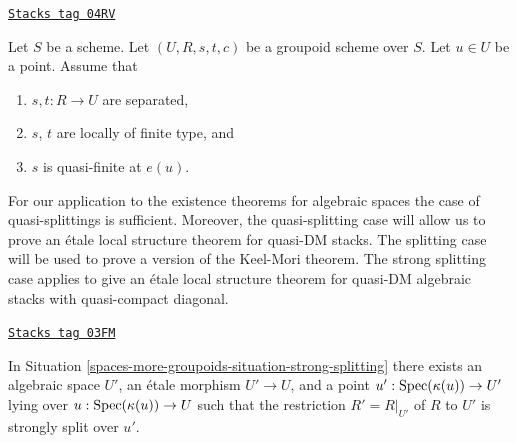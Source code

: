 \begin{definition}

\label{spaces-more-groupoids-situation-quasi-splitting}
\href{https://stacks.math.columbia.edu/tag/04RV}{\texttt{Stacks tag 04RV}}

Let $S$ be a scheme.
Let $(U, R, s, t, c)$ be a groupoid scheme over $S$.
Let $u \in U$ be a point. Assume that
\begin{enumerate}
\item $s, t : R \to U$ are separated,
\item $s$, $t$ are locally of finite type, and
\item $s$ is quasi-finite at $e(u)$.
\end{enumerate}
\end{definition}

For our application to the existence theorems for algebraic spaces
the case of quasi-splittings is sufficient. Moreover, the quasi-splitting
case will allow us to prove an \'etale local structure theorem for
quasi-DM stacks. The splitting case will be used to prove a version
of the Keel-Mori theorem. The strong splitting case applies to give
an \'etale local structure theorem for quasi-DM algebraic stacks
with quasi-compact diagonal.

\begin{lemma}

\label{spaces-more-groupoids-lemma-strong-splitting}
\href{https://stacks.math.columbia.edu/tag/03FM}{\texttt{Stacks tag 03FM}}

In Situation \ref{spaces-more-groupoids-situation-strong-splitting}
there exists an algebraic space $U'$, an \'etale morphism
$U' \to U$, and a point $u' : \operatorname{Spec}(\kappa(u)) \to U'$
lying over $u : \operatorname{Spec}(\kappa(u)) \to U$
such that the restriction $R' = R|_{U'}$ of $R$ to $U'$
is strongly split over $u'$.
\end{lemma}

